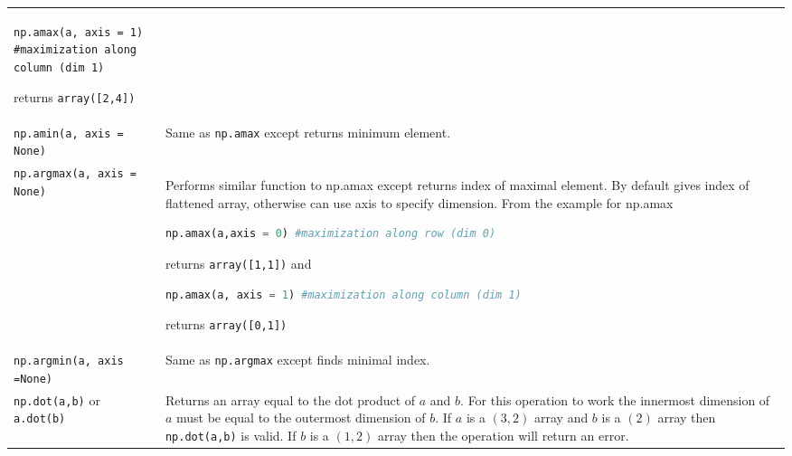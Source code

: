 \begin{tabular}[]{@{}ll@{}}
\begin{minipage}[t]{0.72\columnwidth}
\lstinline!np.amax(a, axis = 1) #maximization along column (dim 1)!

returns \lstinline!array([2,4])!\strut
\end{minipage}\tabularnewline
\begin{minipage}[t]{0.22\columnwidth}\raggedright\strut
\lstinline!np.amin(a, axis = None)!\strut
\end{minipage} & \begin{minipage}[t]{0.72\columnwidth}\raggedright\strut
Same as \lstinline!np.amax! except returns minimum element.\strut
\end{minipage}\tabularnewline
\begin{minipage}[t]{0.22\columnwidth}\raggedright\strut
\lstinline!np.argmax(a, axis = None)!\strut
\end{minipage} & \begin{minipage}[t]{0.72\columnwidth}\raggedright\strut
Performs similar function to np.amax except returns index of maximal
element. By default gives index of flattened array, otherwise can use
axis to specify dimension. From the example for np.amax

\begin{lstlisting}[language=Python]
np.amax(a,axis = 0) #maximization along row (dim 0)
\end{lstlisting}

returns \lstinline!array([1,1])! and

\begin{lstlisting}[language=Python]
np.amax(a, axis = 1) #maximization along column (dim 1)
\end{lstlisting}

returns \lstinline!array([0,1])!\strut
\end{minipage}\tabularnewline
\begin{minipage}[t]{0.22\columnwidth}\raggedright\strut
\lstinline!np.argmin(a, axis =None)!\strut
\end{minipage} & \begin{minipage}[t]{0.72\columnwidth}\raggedright\strut
Same as \lstinline!np.argmax! except finds minimal index.\strut
\end{minipage}\tabularnewline
\begin{minipage}[t]{0.22\columnwidth}\raggedright\strut
\lstinline!np.dot(a,b)! or \lstinline!a.dot(b)!\strut
\end{minipage} & \begin{minipage}[t]{0.72\columnwidth}\raggedright\strut
Returns an array equal to the dot product of \(a\) and \(b\). For this
operation to work the innermost dimension of \(a\) must be equal to the
outermost dimension of \(b\). If \(a\) is a \((3,2)\) array and \(b\) is
a \((2)\) array then \lstinline!np.dot(a,b)! is valid. If \(b\) is a
\((1,2)\) array then the operation will return an error.\strut
\end{minipage}\tabularnewline
\bottomrule
\end{tabular}


